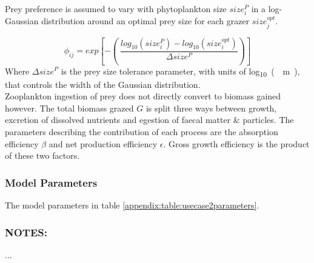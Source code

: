 \documentclass[template.tex]{subfiles}
\begin{document}
Prey preference is assumed to vary with phytoplankton size $size_i^{P}$ in a log-Gaussian distribution around an optimal prey size for each grazer $size_j^{opt}$.

\begin{equation}
    \phi_{ij} = exp \left[ -\left( \ \frac{ log_{10}(size_i^{P}) - log_{10}(size_i^{opt}) }{ \Delta size^{P} } \right) \right]
\end{equation}
Where $\Delta size^{P}$ is the prey size tolerance parameter, with units of \unit{log_{10}(\mu m)}, that controls the width of the Gaussian distribution.\\

Zooplankton ingestion of prey does not directly convert to biomass gained however. The total biomass grazed $G$ is split three ways between growth, excretion of dissolved nutrients and egestion of faecal matter \& particles. The parameters describing the contribution of each process are the absorption efficiency $\beta$ and net production efficiency $\epsilon$. Gross growth efficiency is the product of these two factors.  \\

\subsubsection{Model Parameters}
The model parameters in table \ref{appendix:table:usecase2parameters}.


\subsubsection{NOTES:}
...

\clearpage
\end{document}
